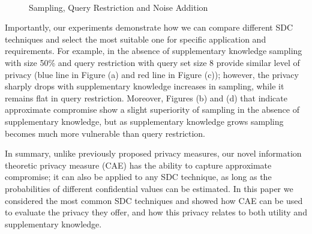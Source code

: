 \documentclass{llncs}
\begin{document}
\begin{figure}[H]
\footnotesize{
    \raggedleft
        \\
\caption{Sampling, Query Restriction and Noise Addition}
    \label{Sampling_USA_General_H0_Area_vs_AttrNumber}}
\end{figure}

Importantly, our experiments demonstrate how we can compare different SDC techniques and select the most suitable one for specific application and requirements. For example, in the absence of supplementary knowledge sampling with size 50\% and query restriction with query set size 8  provide similar level of privacy (blue line in Figure (a) and red line in Figure (c)); however, the privacy sharply drops with  supplementary knowledge increases in sampling, while it remains flat in query restriction. Moreover, Figures (b) and (d) that indicate approximate compromise show a slight superiority of sampling in the absence of supplementary knowledge,  but as supplementary knowledge grows sampling becomes much more vulnerable than query restriction.

In summary, unlike previously proposed privacy measures, our novel information theoretic privacy measure (CAE) has the ability to capture approximate compromise; it   can also be applied to any SDC technique, as long as the probabilities of different confidential values can be estimated. In this paper we considered the most common SDC techniques and showed how CAE can be used to evaluate the privacy they offer, and how this privacy relates to both utility and supplementary knowledge.
\end{document}
